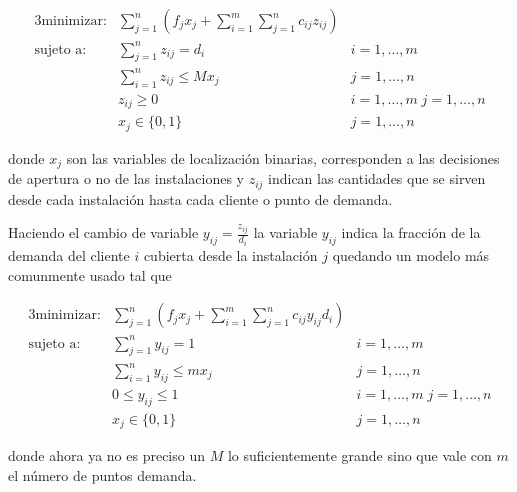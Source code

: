 \begin{alignat}{3}
    \text{minimizar:}   & \sum_{j=1}^n(f_{j}x_{j} + \sum_{i=1}^m\sum_{j=1}^n c_{ij}z_{ij})  &                           \\
    \text{sujeto a:}    & \sum_{j=1}^nz_{ij}=d_i                                            & i=1,\dots,m               \\
                        & \sum_{i=1}^nz_{ij}\leq Mx_j                                       & j=1,\dots,n               \\
                        & z_{ij}\geq 0                                                      & i=1,\dots,m\; j=1,\dots,n \\
                        & x_{j}\in\{0,1\}                                                   & j=1,\dots,n
\end{alignat}

\noindent donde $x_j$ son las variables de localización binarias, corresponden a las decisiones de apertura o no de las
instalaciones y $z_{ij}$ indican las cantidades que se sirven desde cada instalación hasta cada cliente o punto de demanda.

\vspace*{2mm}

Haciendo el cambio de variable $y_{ij}=\frac{z_{ij}}{d_i}$ la variable $y_{ij}$ indica la fracción de la demanda del cliente
$i$ cubierta desde la instalación $j$ quedando un modelo más comunmente usado tal que

\begin{alignat}{3}
    \text{minimizar:}   & \sum_{j=1}^n(f_{j}x_{j} + \sum_{i=1}^m\sum_{j=1}^n c_{ij}y_{ij}d_i)   &                           \\
    \text{sujeto a:}    & \sum_{j=1}^ny_{ij}=1                                                  & i=1,\dots,m               \\
                        & \sum_{i=1}^ny_{ij}\leq mx_j                                           & j=1,\dots,n               \\
                        & 0\leq y_{ij}\leq 1                                                    & i=1,\dots,m\; j=1,\dots,n \\
                        & x_{j}\in\{0,1\}                                                       & j=1,\dots,n
\end{alignat}

\noindent donde ahora ya no es preciso un $M$ lo suficientemente grande sino que vale con $m$ el número de puntos demanda. 

